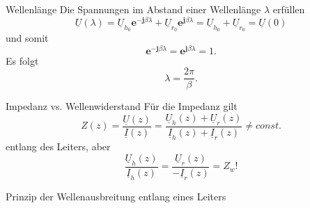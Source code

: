 \documentclass{beamer}
\begin{document}
\begin{frame}{Wellenlänge}
Die Spannungen im Abstand einer Wellenlänge $\lambda$ erfüllen
\begin{equation}
\underline{U}(\lambda) =
\underline{U}_{h_{0}} \mathbf{e}^{- \mathbf{j} \beta \lambda}
+
\underline{U}_{r_{0}} \mathbf{e}^{\mathbf{j} \beta \lambda}
= \underline{U}_{h_{0}} + \underline{U}_{r_{0}}
= \underline{U}(0)
\end{equation}
und somit
\[
\mathbf{e}^{- \mathbf{j} \beta \lambda} = \mathbf{e}^{\mathbf{j} \beta \lambda} = 1.
\]
Es folgt
\[
\lambda = \frac{2 \pi}{\beta}.
\]
\end{frame}


\begin{frame}{Impedanz vs. Wellenwiderstand}
Für die Impedanz gilt
\begin{equation*}
    Z(z) = \frac{\underline{U}(z)}{\underline{I}(z)} =
     \frac{\underline{U}_{h}(z) + \underline{U}_{r}(z)}{\underline{I}_{h}(z) +
     \underline{I}_{r}(z)} \ne const.
\end{equation*}
entlang des Leiters, aber
\[ \frac{\underline{U}_{h}(z)}{\underline{I}_{h}(z)}
= \frac{\underline{U}_{r}(z)}{- \underline{I}_{r}(z)} = Z_{w}! \]

\end{frame}


\begin{frame}{Prinzip der Wellenausbreitung entlang eines Leiters}

    \begin{figure}[!htb]
        \begin{center}
            
        \end{center}
    \end{figure}

\end{frame}
\end{document}
